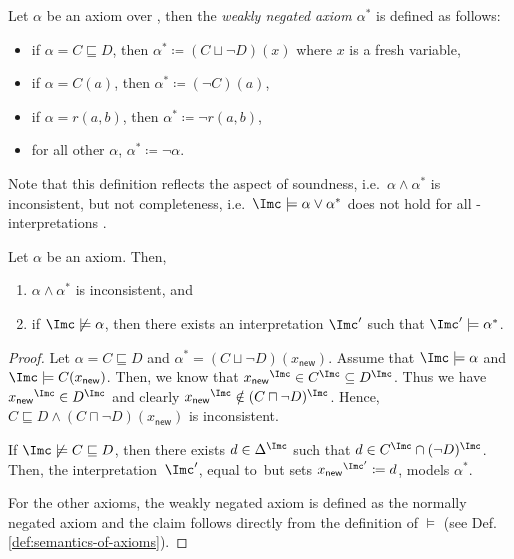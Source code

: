 \begin{definition}
  Let $\alpha$ be an axiom over \Nsig, then the \emph{weakly negated axiom $\alpha^{*}$} is defined
  as follows:
  \begin{itemize}
  \item if $\alpha = C \sqsubseteq D$, then $\alpha^{*} \coloneqq (C \sqcup \lnot D)(x)$ where $x$
    is a fresh variable,
  \item if $\alpha = C(a)$, then $\alpha^{*} \coloneqq (\lnot C)(a)$,
  \item if $\alpha = r(a,b)$, then $\alpha^{*} \coloneqq \lnot r(a,b)$,
  \item for all other $\alpha$, $\alpha^{*} \coloneqq \lnot \alpha$. \qedhere
  \end{itemize}
\end{definition}

Note that this definition reflects the aspect of  soundness, i.e.\ $\alpha\land\alpha^{*}$ is inconsistent, but not
completeness, i.e.~$\I\models\alpha\lor\alpha^{*}$ does not hold for all \Nsig-interpretations \I.

\begin{lemma}\label{lem:weakly-negation-inconsistent}
  Let $\alpha$ be an axiom. Then,
  \begin{enumerate}
  \item $\alpha\land\alpha^{*}$ is inconsistent, and
  \item if $\I\not\models\alpha$, then there exists an interpretation $\I'$ such that $\I'\models\alpha^{*}$.
  \end{enumerate}
\end{lemma}
\begin{proof}
  Let $\alpha = C \sqsubseteq D$ and $\alpha^{*} = (C \sqcup \lnot D)(x_{\mathsf{new}})$. Assume
  that $\I \models \alpha$ and $\I \models C(x_{\mathsf{new}})$.  Then, we know that
  ${x_{\mathsf{new}}}^{\I} \in C^{\I} \subseteq D^{\I}$. Thus we have
  ${x_{\mathsf{new}}}^{\I} \in D^{\I}$ and clearly
  ${x_{\mathsf{new}}}^{\I} \notin (C \sqcap \lnot D)^{\I}$. Hence,
  $C \sqsubseteq D \land (C \sqcap \lnot D)(x_{\mathsf{new}})$ is inconsistent.

  If $\I\not\models C \sqsubseteq D$, then there exists $d\in\Delta^{\I}$ such that
  $d \in C^{\I} \cap (\lnot D)^{\I}$. Then, the interpretation~$\I'$, equal to~\I but sets
  ${x_{\mathsf{new}}}^{\I'} \coloneqq d$, models $\alpha^{*}$.

  For the other axioms, the weakly negated axiom is defined as the normally negated axiom and the
  claim follows directly from the definition of $\models$ (see Def. \ref{def:semantics-of-axioms}).
\end{proof}

